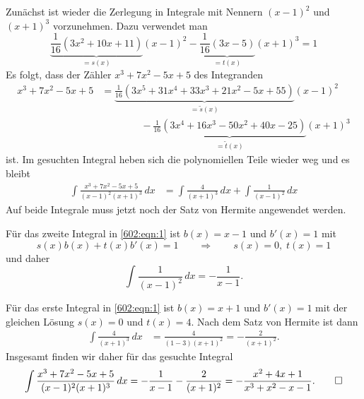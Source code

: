 \begin{loesung}
\begin{teilaufgaben}
\item
Zunächst ist wieder die Zerlegung in Integrale mit Nennern
$(x-1)^2$ und $(x+1)^3$ vorzunehmen.
Dazu verwendet man
\[
\underbrace{\frac{1}{16}(3x^2+10x+11)}_{\displaystyle =s(x)}(x-1)^2
-
\underbrace{\frac{1}{16}(3x-5)}_{\displaystyle =t(x)}(x+1)^3
=
1
\]
Es folgt, dass der Zähler $x^3+7x^2-5x+5$ des Integranden
\begin{align*}
x^3+7x^2-5x+5
&=
\underbrace{
\frac{1}{16}(3x^5+31x^4+33x^3+21x^2-5x+55)
}_{\displaystyle = \tilde{s}(x)}
(x-1)^2
\\
&\qquad\qquad
-
\underbrace{
\frac{1}{16}(3x^4+16x^3-50x^2+40x-25)
}_{\displaystyle = \tilde{t}(x)}
(x+1)^3
\end{align*}
ist.
Im gesuchten Integral heben sich die polynomiellen Teile wieder 
weg und es bleibt
\begin{align}
\int \frac{x^3+7x^2-5x+5}{(x-1)^2(x+1)^3}\,dx
&=
\int\frac{4}{(x+1)^3}\,dx
+
\int\frac{1}{(x-1)^2}\,dx
\label{602:eqn:1}
\end{align}
Auf beide Integrale muss jetzt noch der Satz von Hermite
angewendet werden.

Für das zweite Integral in \eqref{602:eqn:1} ist $b(x)=x-1$ und $b'(x)=1$ mit
\[
s(x)b(x)+t(x)b'(x)=1
\qquad\Rightarrow\qquad
s(x)=0,\; t(x)=1
\]
und daher
\[
\int \frac{1}{(x-1)^2}\,dx
=
-
\frac{1}{x-1}.
\]

Für das erste Integral in \eqref{602:eqn:1} ist $b(x)=x+1$ und $b'(x)=1$
mit der gleichen Lösung $s(x)=0$ und $t(x)=4$.
Nach dem Satz von Hermite ist dann
\begin{align*}
\int \frac{4}{(x+1)^3}\,dx
&=
\frac{4}{(1-3)(x+1)^2}
=
-
\frac{2}{(x+1)^2}.
\end{align*}
Insgesamt finden wir daher für das gesuchte Integral
\[
\int \frac{x^3+7x^2-5x+5}{(x-1)^2(x+1)^3}\,dx
=
-
\frac{1}{x-1}
-
\frac{2}{(x+1)^2}
=
-
\frac{x^2+4x+1}{x^3+x^2-x-1}.
\qedhere
\]
\end{teilaufgaben}
\end{loesung}
